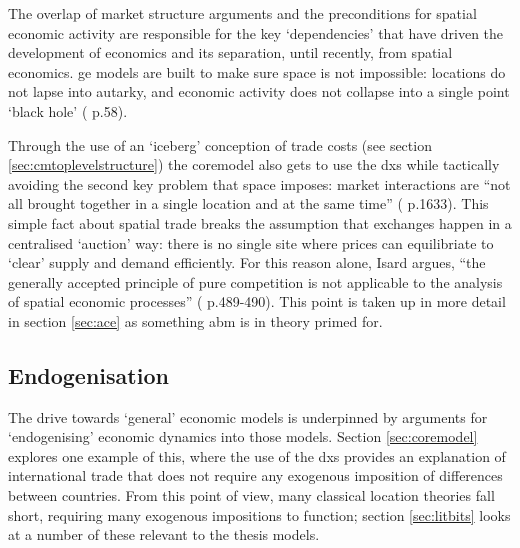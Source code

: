 The overlap of market structure arguments and the preconditions for spatial economic activity are responsible for the key `dependencies' that have driven the development of economics and its separation, until recently, from spatial economics. \gls{ge} models are built to make sure space is not impossible: locations do not lapse into autarky, and economic activity does not collapse into a single point `black hole' (\citealt{fujita_location_1999} p.58). 

Through the use of an `iceberg' conception of trade costs (see section \ref{sec:cmtoplevelstructure}) the \gls{coremodel} also gets to use the \gls{dxs} while tactically avoiding the second key problem that space imposes: market interactions are ``not all brought together in a single location and at the same time'' (\citealt{leijonhufvud_agent-based_2006} p.1633). This simple fact about spatial trade breaks the assumption that exchanges happen in a centralised `auction' way: there is no single site where prices can equilibriate to `clear' supply and demand efficiently. For this reason alone, Isard argues, ``the generally accepted principle of pure competition is not applicable to the analysis of spatial economic processes'' (\citealt{isard_location_1956}  p.489-490). This point is taken up in more detail in section \ref{sec:ace} as something \gls{abm} is in theory primed for. 

\subsection{Endogenisation \label{sec:endog}}

The drive towards `general' economic models is underpinned by arguments for `endogenising' economic dynamics into those models. Section \ref{sec:coremodel} explores one example of this, where the use of the \gls{dxs} provides an explanation of international trade that does not require any exogenous imposition of differences between countries. From this point of view, many classical location theories fall short, requiring many exogenous impositions to function; section \ref{sec:litbits} looks at a number of these relevant to the thesis models. 

